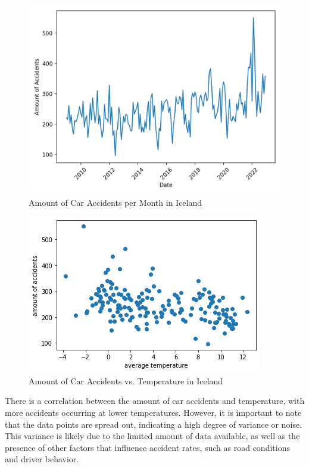 \documentclass{article}
\begin{document}
\begin{figure}[h!]
    \centering
    \includegraphics[scale=0.5]{../figures/highres/isl_accidents_over_time.png}
    \caption{Amount of Car Accidents per Month in Iceland}
    \label{fig:accidents_per_month}
\end{figure}

\begin{figure}[h!]
    \centering
    \includegraphics[scale=0.5]{../figures/highres/isl_accidents_against_temp.png}
    \caption{Amount of Car Accidents vs. Temperature in Iceland}
    \label{fig:accidents_vs_temp}
\end{figure}


There is a correlation between the amount of car accidents and temperature, with more accidents occurring at lower temperatures. However, it is important to note that the data points are spread out, indicating a high degree of variance or noise. This variance is likely due to the limited amount of data available, as well as the presence of other factors that influence accident rates, such as road conditions and driver behavior.
\end{document}
